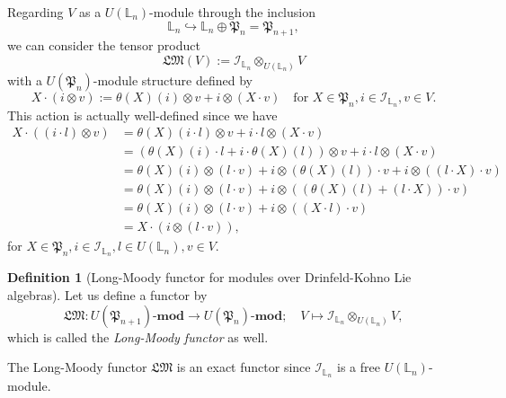 \documentclass[a4paper,12pt]{article}
\theoremstyle{definition}
\newtheorem{df}[thm]{Definition}
\theoremstyle{remark}
\begin{document}
Regarding $V$ as a $U(\mathbb{L}_{n})$-module
through the inclusion 
\[
	\mathbb{L}_{n}\hookrightarrow \mathbb{L}_{n}\oplus \mathfrak{P}_{n}=\mathfrak{P}_{n+1},
\]
we can consider the tensor product
\[
	\mathfrak{LM}(V):=\mathcal{I}_{\mathbb{L}_{n}}\otimes_{U(\mathbb{L}_{n})}V
\]
with a $U(\mathfrak{P}_{n})$-module structure defined by
\[
	X\cdot (i\otimes v):=\theta(X)(i)\otimes v
	+i\otimes (X\cdot v)
	\quad \text{for $X\in \mathfrak{P}_{n}, i\in \mathcal{I}_{\mathbb{L}_{n}}, v\in V$}.	
\]
This action is actually well-defined since we have
\begin{align*}
X\cdot ((i\cdot l)\otimes v)&=\theta(X)(i\cdot l)\otimes v+i\cdot l\otimes (X\cdot v)\\
&=(\theta(X)(i)\cdot l+i\cdot \theta(X)(l))\otimes v+i\cdot l\otimes (X\cdot v)\\
&=\theta(X)(i)\otimes (l\cdot v)+i\otimes (\theta(X)(l))\cdot v+i\otimes ((l\cdot X)\cdot v)\\
&=\theta(X)(i)\otimes (l\cdot v)+i\otimes ((\theta(X)(l)+(l\cdot X))\cdot v)\\
&=\theta(X)(i)\otimes (l\cdot v)+i\otimes ((X\cdot l)\cdot v)\\
&=X\cdot (i\otimes (l\cdot v)),
\end{align*}
for $X\in \mathfrak{P}_{n}, i\in \mathcal{I}_{\mathbb{L}_{n}}, l\in U(\mathbb{L}_{n}), v\in V$.

\begin{df}[Long-Moody functor for modules over Drinfeld-Kohno Lie algebras]
	Let us define a 
	functor by 
	\[
		\mathfrak{LM}\colon U(\mathfrak{P}_{n+1})\text{-}\mathbf{mod}\to U(\mathfrak{P}_{n})\text{-}\mathbf{mod}; \quad V\mapsto \mathcal{I}_{\mathbb{L}_{n}}\otimes_{U(\mathbb{L}_{n})}V,
	\]
	which is called the \emph{Long-Moody functor} as well.
\end{df}
The Long-Moody functor $\mathfrak{LM}$ is an exact functor since $\mathcal{I}_{\mathbb{L}_{n}}$ is a free $U(\mathbb{L}_{n})$-module.
\end{document}
